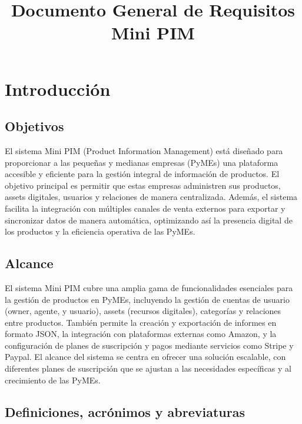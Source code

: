\documentclass{article}
\title{Documento General de Requisitos Mini PIM}
\author{}
\date{}
\begin{document}
\maketitle

\tableofcontents

\newpage

\section{Introducción}

\subsection{Objetivos}

El sistema Mini PIM (Product Information Management) está diseñado para proporcionar a las pequeñas y medianas empresas (PyMEs) una plataforma accesible y eficiente para la gestión integral de información de productos. El objetivo principal es permitir que estas empresas administren sus productos, assets digitales, usuarios y relaciones de manera centralizada. Además, el sistema facilita la integración con múltiples canales de venta externos para exportar y sincronizar datos de manera automática, optimizando así la presencia digital de los productos y la eficiencia operativa de las PyMEs.

\subsection{Alcance}

El sistema Mini PIM cubre una amplia gama de funcionalidades esenciales para la gestión de productos en PyMEs, incluyendo la gestión de cuentas de usuario (owner, agente, y usuario), assets (recursos digitales), categorías y relaciones entre productos. También permite la creación y exportación de informes en formato JSON, la integración con plataformas externas como Amazon, y la configuración de planes de suscripción y pagos mediante servicios como Stripe y Paypal. El alcance del sistema se centra en ofrecer una solución escalable, con diferentes planes de suscripción que se ajustan a las necesidades específicas y al crecimiento de las PyMEs.

\subsection{Definiciones, acrónimos y abreviaturas}
\end{document}

